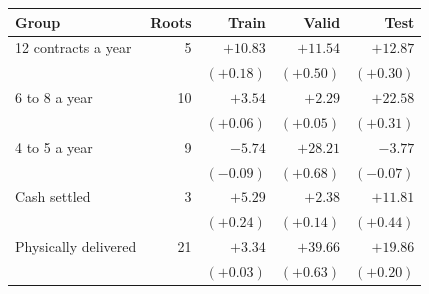\begin{tabular}{@{}l r r r r@{}}
\toprule
Group & Roots & Train & Valid & Test \\
\midrule
12 contracts a year & 5 & $+10.83$ & $+11.54$ & $+12.87$ \\
 &  & $(+0.18)$ & $(+0.50)$ & $(+0.30)$ \\
6 to 8 a year & 10 & $+3.54$ & $+2.29$ & $+22.58$ \\
 &  & $(+0.06)$ & $(+0.05)$ & $(+0.31)$ \\
4 to 5 a year & 9 & $-5.74$ & $+28.21$ & $-3.77$ \\
 &  & $(-0.09)$ & $(+0.68)$ & $(-0.07)$ \\
\midrule
Cash settled & 3 & $+5.29$ & $+2.38$ & $+11.81$ \\
 &  & $(+0.24)$ & $(+0.14)$ & $(+0.44)$ \\
Physically delivered & 21 & $+3.34$ & $+39.66$ & $+19.86$ \\
 &  & $(+0.03)$ & $(+0.63)$ & $(+0.20)$ \\
\bottomrule
\end{tabular}
